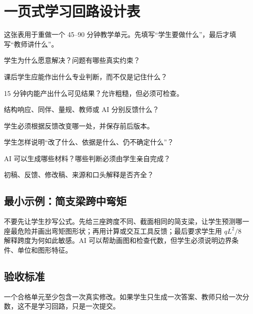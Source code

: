 \chapter{一页式学习回路设计表}

这张表用于重做一个 45--90 分钟教学单元。先填写“学生要做什么”，最后才填写“教师讲什么”。

\begin{description}[style=nextline,leftmargin=3.2cm]
  \item[值得求解的问题] 学生为什么愿意解决？问题有哪些真实约束？
  \item[目标判断] 课后学生应能作出什么专业判断，而不仅是记住什么？
  \item[首次作品] 15 分钟内能产出什么可见结果？允许粗糙，但必须可检查。
  \item[反馈来源] 结构响应、同伴、量规、教师或 AI 分别反馈什么？
  \item[第二次修改] 学生必须根据反馈改变哪一处，并保存前后版本。
  \item[解释与答辩] 学生怎样说明“改了什么、依据是什么、仍不确定什么”？
  \item[AI 边界] AI 可以生成哪些材料？哪些判断必须由学生亲自完成？
  \item[验收证据] 初稿、反馈、修改稿、来源和口头解释是否齐全？
\end{description}

\section*{最小示例：简支梁跨中弯矩}

不要先让学生抄写公式。先给三座跨度不同、截面相同的简支梁，让学生预测哪一座最危险并画出弯矩图形状；再用计算或交互工具反馈；最后要求学生用 $qL^2/8$ 解释跨度为何如此敏感。AI 可以帮助画图和检查代数，但学生必须说明边界条件、单位和图形特征。

\section*{验收标准}

一个合格单元至少包含一次真实修改。如果学生只生成一次答案、教师只给一次分数，这不是学习回路，只是一次提交。

